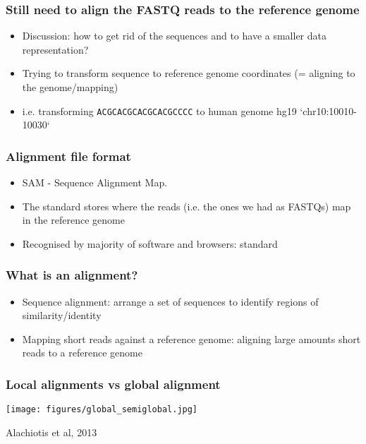 \documentclass{beamer}
\begin{document}
\begin{frame}
  \frametitle{Still need to align the FASTQ reads to the reference genome}
  \begin{itemize}
  \item Discussion: how to get rid of the sequences and to have a smaller data representation?
  \item Trying to transform sequence to reference genome coordinates (= aligning to the genome/mapping) 
  \item i.e. transforming \texttt{ACGCACGCACGCACGCCCC} to human genome hg19 `chr10:10010-10030`
  \end{itemize}
\end{frame}



\begin{frame}
  \frametitle{Alignment file format}
  \begin{itemize}
  \item  SAM - Sequence Alignment Map.	
  \item The standard stores where the reads (i.e. the ones we had as FASTQs) map in the reference genome
  \item  Recognised by majority of software and browsers: standard

  \end{itemize}
\end{frame}

\begin{frame}
  \frametitle{What is an alignment?}
  \begin{itemize}
  \item Sequence alignment: arrange a set of sequences to identify regions of similarity/identity
  \item Mapping short reads against a reference genome: aligning large amounts short reads to a reference genome
  \end{itemize}
\end{frame}

\begin{frame}
  \frametitle{Local alignments vs global alignment}
\centering
\texttt{[image: figures/global\_semiglobal.jpg]}

Alachiotis et al, 2013
\end{frame}
\end{document}
